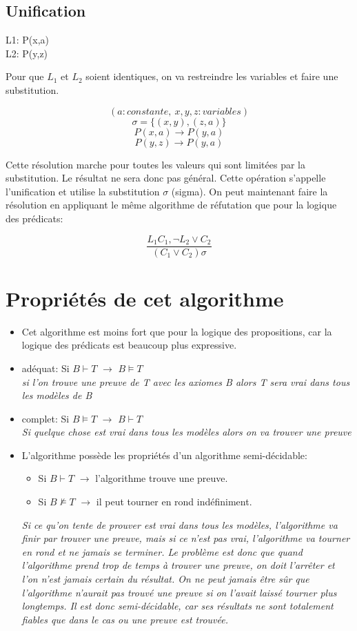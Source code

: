 {\subsection{Unification}
\begin{minipage}{0.25\textwidth}
		L1:  P(x,a)\\
		L2:  P(y,z)
\end{minipage}
\begin{minipage}{0.75\textwidth}
		Pour que $L_1$ et $L_2$ soient identiques, on va restreindre les variables et faire une substitution.
\end{minipage}

$$(a: constante,\ x,y,z : variables)$$
$$\sigma=\{(x,y),(z,a)\}$$
$$P(x,a) \to P(y,a)$$
$$P(y,z) \to P(y,a)$$

Cette résolution marche pour toutes les valeurs qui sont limitées par la substitution. Le résultat ne sera donc pas général.
Cette opération s'appelle l'unification et utilise la substitution $\sigma$ (sigma). 
On peut maintenant faire la résolution en appliquant  le même algorithme de réfutation que pour la logique des prédicats: 

$$\frac{L_1C_1, \neg L_2 \lor C_2}{(C_1 \lor C_2)\sigma}$$

\section{Propriétés de cet algorithme}
\begin{itemize}
\item Cet algorithme est moins fort que pour la logique des propositions, car la logique des prédicats est beaucoup plus expressive.
\item  adéquat: Si $B\vdash T$ $\to$ $B \models T$\\
\textit{si l'on trouve une preuve de T avec les axiomes B alors T sera vrai dans tous les modèles de B}
\item complet: Si $B \models T$ $\to$ $B\vdash T$\\
\textit{Si quelque chose est vrai dans tous les modèles alors on va trouver une preuve}
\item L'algorithme possède les propriétés d'un algorithme semi-décidable:
\begin{itemize}
\item Si $B \vdash T$ $\to$ l'algorithme trouve une preuve. 
\item Si $B  \nvDash T$ $\to$ il peut tourner en rond indéfiniment.
\end{itemize}
\textit{Si ce qu'on tente de prouver est vrai dans tous les modèles, l'algorithme va finir par trouver une preuve, mais si ce n'est pas vrai, l'algorithme va tourner en rond et ne jamais se terminer. Le problème est donc que quand l'algorithme prend trop de temps à trouver une preuve, on doit l'arrêter et l'on n'est jamais certain du résultat. On ne peut jamais être sûr que l'algorithme n'aurait pas trouvé une preuve si on l'avait laissé tourner plus longtemps. Il est donc semi-décidable, car ses résultats ne sont totalement fiables que dans le cas ou une preuve est trouvée. }
\end{itemize}
}
